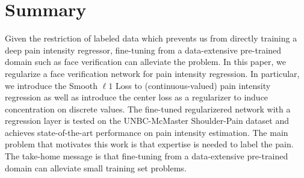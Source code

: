 \documentclass{article}
\begin{document}

\section{Summary}
Given the restriction of labeled data which prevents us from directly training a deep pain intensity regressor, fine-tuning from a data-extensive pre-trained domain such as face verification can alleviate the problem.
In this paper, we regularize a face verification network for pain intensity regression. 
In particular, we introduce the Smooth $\ell 1$ Loss to (continuous-valued) pain intensity regression
as well as introduce the center loss as a regularizer to induce concentration on discrete values.
The fine-tuned regularizered network with a regression layer is tested on the UNBC-McMaster Shoulder-Pain dataset and achieves state-of-the-art performance on pain intensity estimation.
The main problem that motivates this work is that expertise is needed to label the pain.
The take-home message is that fine-tuning from a data-extensive pre-trained domain can alleviate small training set problems.
\end{document}
